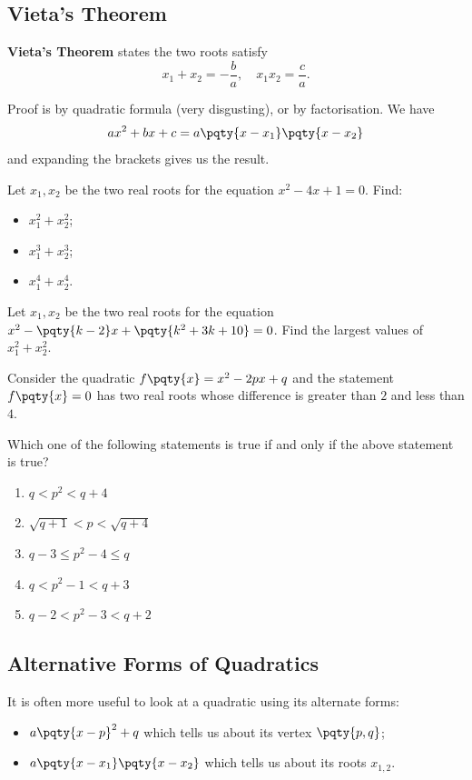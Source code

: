 \documentclass{article}
\begin{document}
\subsection{Vieta's Theorem}
\textbf{Vieta's Theorem} states the two roots satisfy
\[
    x_1 + x_2 = - \frac{b}{a}, \quad x_1 x_2 = \frac{c}{a}.
\]

Proof is by quadratic formula (very disgusting), or by factorisation. We have
\[
    a x^2 + bx + c = a \pqty{x - x_1} \pqty{x - x_2}
\]
and expanding the brackets gives us the result.

\begin{example}
    Let \(x_1, x_2\) be the two real roots for the equation \(x^2 - 4x + 1 = 0\). Find:
    \begin{itemize}
        \item \(x_1^2 + x_2^2\);
        \item \(x_1^3 + x_2^3\);
        \item \(x_1^4 + x_2^4\).
    \end{itemize}
\end{example}

\begin{example}
    Let \(x_1, x_2\) be the two real roots for the equation \(x^2 - \pqty{k - 2} x + \pqty{k^2 + 3k + 10} = 0\). Find the largest values of \(x_1^2 + x_2^2\).
\end{example}

\begin{example}[TMUA 2016 P2 Q15]
    Consider the quadratic \(f\pqty{x} = x^2 - 2px + q\) and the statement \(f\pqty{x} = 0\) has two real roots whose difference is greater than \(2\) and less than \(4\).

    Which one of the following statements is true if and only if the above statement is true?

    \begin{enumerate}
        \item \(q < p^2 < q + 4\)
        \item \(\sqrt{q + 1} < p < \sqrt{q + 4}\)
        \item \(q - 3 \leq p^2 - 4 \leq q\)
        \item \(q < p^2 - 1 < q + 3\)
        \item \(q - 2 < p^2 - 3 < q + 2\)
    \end{enumerate}
\end{example}

\subsection{Alternative Forms of Quadratics}
It is often more useful to look at a quadratic using its alternate forms:
\begin{itemize}
    \item \(a \pqty{x - p}^2 + q\) which tells us about its vertex \(\pqty{p, q}\);
    \item \(a \pqty{x - x_1} \pqty{x - x_2}\) which tells us about its roots \(x_{1, 2}\).
\end{itemize}
\end{document}
